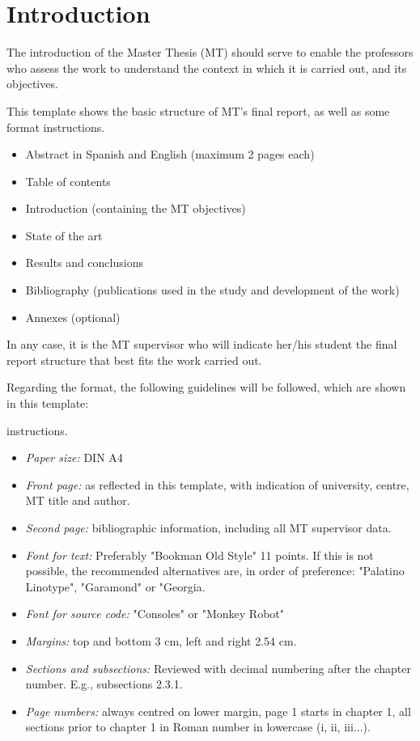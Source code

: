 \chapter{Introduction}
\label{ch:intro}

The introduction of the Master Thesis (MT) should serve to enable the professors who assess the work to understand the context in which it is carried out, and its objectives.

This template shows the basic structure of MT's final report, as well as some format instructions.
\begin{itemize}
\item Abstract in Spanish and English (maximum 2 pages each)
\item Table of contents
\item Introduction (containing the MT objectives)
\item State of the art
\item Results and conclusions
\item Bibliography (publications used in the study and development of the work)
\item Annexes (optional)
\end{itemize}

In any case, it is the MT supervisor who will indicate her/his student the final report structure that best fits the work carried out.

Regarding the format, the following guidelines will be followed, which are shown in this template:

instructions.
\begin{itemize}
\item \textit{Paper size:} DIN A4
\item \textit{Front page:} as reflected in this template, with indication of university, centre, MT title and author.
\item \textit{Second page:} bibliographic information, including all MT supervisor data.
\item \textit{Font for text:} Preferably "Bookman Old Style" 11 points. If this is not possible, the recommended alternatives are, in order of preference: "Palatino Linotype", "Garamond" or "Georgia.
\item \textit{Font for source code:} "Consoles" or "Monkey Robot"
\item \textit{Margins:} top and bottom 3 cm, left and right 2.54 cm.
\item \textit{Sections and subsections:} Reviewed with decimal numbering after the chapter number. E.g., subsections 2.3.1.
\item \textit{Page numbers:} always centred on lower margin, page 1 starts in chapter 1, all sections prior to chapter 1 in Roman number in lowercase (i, ii, iii...).
\end{itemize}

